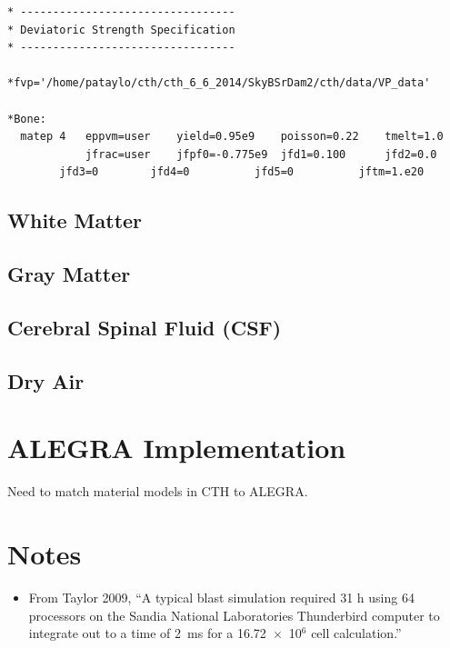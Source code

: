 \documentclass[12pt,reqno]{amsart}
\begin{document}
\begin{verbatim}
* ---------------------------------
* Deviatoric Strength Specification
* ---------------------------------

*fvp='/home/pataylo/cth/cth_6_6_2014/SkyBSrDam2/cth/data/VP_data'

*Bone:
  matep 4   eppvm=user    yield=0.95e9    poisson=0.22    tmelt=1.0
            jfrac=user    jfpf0=-0.775e9  jfd1=0.100      jfd2=0.0
	    jfd3=0        jfd4=0          jfd5=0          jftm=1.e20

\end{verbatim}


\subsection{White Matter}

\subsection{Gray Matter}

\subsection{Cerebral Spinal Fluid (CSF)}

\subsection{Dry Air}



\clearpage
\section{ALEGRA Implementation}
Need to match material models in CTH to ALEGRA.

\section{Notes}
\begin{itemize}
\item From Taylor 2009, ``A typical blast simulation required 31 h using 64 
processors on the Sandia National Laboratories Thunderbird computer to 
integrate out to a time of 2~ms for a 16.72~$\times$~10$^6$ cell calculation.''
\end{itemize}
\end{document}
